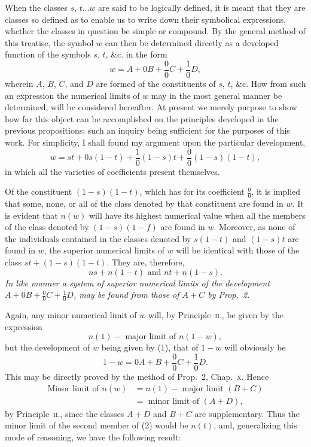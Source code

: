 \documentclass[oneside]{book}
\begin{document}
When the classes $s$, $t \dotsc w$ are said to be logically defined, it
is meant that they are classes so defined as to enable us to write
down their symbolical expressions, whether the classes in question
be simple or compound. By the general method of this
treatise, the symbol $w$ can then be determined directly as a developed
function of the symbols $s$, $t$, \&c. in the form
\begin{equation*}
w = A + 0B + \frac{0}{0}C + \frac{1}{0}D,      \tag{1}
\end{equation*}
wherein $A$, $B$, $C$, and $D$ are formed of the constituents of $s$, $t$, \&c.
How from such an expression the numerical limits of $w$ may in
the most general manner be determined, will be considered hereafter.
At present we merely purpose to show how far this object
can be accomplished on the principles developed in the previous
propositions; such an inquiry being sufficient for the purposes of
this work. For simplicity, I shall found my argument upon the
particular development,
\begin{equation*}
w = st + 0s(1 - t) + \frac{1}{0}(1 - s) t + \frac{0}{0}(1 - s)(1 - t),
\tag{2}
\end{equation*}
in which all the varieties of coefficients present themselves.

Of the constituent $(1-s) (1-t)$, which has for its coefficient $\frac{0}{0}$, it is implied that some, none, or all of the class denoted
by that constituent are found in $w$. It is evident that $n(w)$ will
have its highest numerical value when all the members of the
class denoted by $(1-s)(1-f)$ are found in $w$. Moreover, as
none of the individuals contained in the classes denoted by
$s(1-t)$ and $(1-s)t$ are found in $w$, the superior numerical limits
of $w$ will be identical with those of the class $st + (1-s)(1-t)$.
They are, therefore,
\[
  ns + n(1-t) \text{ and } nt + n(1-s).
\]
\emph{In like manner a system of superior numerical limits of the
development $A + 0 B + \frac{0}{0}C + \frac{1}{0}D$, may be found from those of
$A + C$ by Prop.~2.}

Again, any minor numerical limit of $w$ will, by Principle~\textsc{ii.},
be given by the expression
\[
  n(1) - \text{ major limit of } n(1-w),
\]
but the development of $w$ being given by (1), that of $1-w$ will
obviously be
\[
  1 - w = 0A + B + \frac{0}{0}C + \frac{1}{0}D.
\]
This may be directly proved by the method of Prop.~2, Chap.~\textsc{x.}
Hence
\begin{align*}
\text{Minor limit of } n(w) &= n(1) - \text{ major limit } (B + C) \\
                            &= \text{ minor limit of } (A + D),
\end{align*}
by Principle~\textsc{ii.}, since the classes $A + D$ and $B + C$ are supplementary.
Thus the minor limit of the second member of (2)
would be $n(t)$, and, generalizing this mode of reasoning, we have
the following result:
\end{document}
